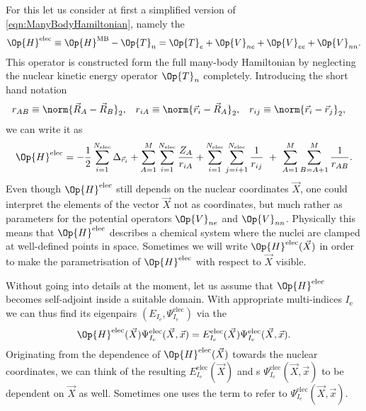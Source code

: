 For this let us consider at first
a simplified version of \eqref{eqn:ManyBodyHamiltonian},
namely the 
\[
	\Op{H}^\text{elec} \equiv \Op{H}^\text{MB} - \Op{T}_n
	= \Op{T}_e + \Op{V}_{ne} + \Op{V}_{ee} + \Op{V}_{nn}.
\]
This operator is constructed form the full many-body Hamiltonian
by neglecting the nuclear kinetic energy operator $\Op{T}_n$ completely.
Introducing the short hand notation
\begin{align*}
r_{AB} &\equiv \norm{\vec{R}_A - \vec{R}_B}_2, &
r_{iA} &\equiv \norm{\vec{r}_i - \vec{R}_A}_2, &
r_{ij} &\equiv \norm{\vec{r}_i - \vec{r}_j}_2, &
\end{align*}
we can write it as
\begin{equation}
	\Op{H}^\text{elec}
	= - \frac12 \sum_{i=1}^{\Nelec} \Delta_{\vec{r}_i}
	+ \sum_{A=1}^M \sum_{i=1}^{\Nelec} \frac{Z_A}{r_{iA}}
	+ \sum_{i=1}^{\Nelec} \sum_{j=i+1}^{\Nelec} \frac{1}{r_{ij}}
	\  + \  %
	\sum_{A=1}^{M} \sum_{B=A+1}^{M} \frac{1}{r_{AB}}.
	\label{eqn:ElectronicFullHamiltonian}
\end{equation}
Even though $\Op{H}^\text{elec}$ still depends on the nuclear coordinates $\vec{X}$,
one could interpret the elements of the vector
$\vec{X}$ not as coordinates,
but much rather as parameters for the potential operators $\Op{V}_{ne}$ and $\Op{V}_{nn}$.
Physically this means that $\Op{H}^\text{elec}$ describes a chemical system
where the nuclei are clamped at well-defined points in space.
Sometimes we will write $\Op{H}^\text{elec}(\vec{X})$
in order to make the parametrisation of $\Op{H}^\text{elec}$ with respect to $\vec{X}$
visible.

\newcommand{\Iel}{I_\text{e}}
\newcommand{\Inu}{I_\text{n}}
Without going into details at the moment,
let us assume that $\Op{H}^\text{elec}$ becomes self-adjoint
inside a suitable domain.
With appropriate multi-indices $\Iel$
we can thus find its eigenpairs $(E_{\Iel}, \Psi^\text{elec}_{\Iel})$
via the 
\begin{equation}
	\Op{H}^\text{elec}(\vec{X}) \Psi^\text{elec}_{\Iel}(\vec{X}, \vec{x})
	= E^\text{elec}_{\Iel}(\vec{X})
		\Psi^\text{elec}_{\Iel}(\vec{X}, \vec{x}).
	\label{eqn:ElectronicSchrödinger}
\end{equation}
Originating from the dependence of $\Op{H}^\text{elec}(\vec{X})$
towards the nuclear coordinates,
we can think of the resulting 
$E^\text{elec}_{\Iel}(\vec{X})$
and s $\Psi^\text{elec}_{\Iel}(\vec{X}, \vec{x})$
to be dependent on $\vec{X}$ as well.
Sometimes one uses the term 
to refer to $\Psi^\text{elec}_{\Iel}(\vec{X}, \vec{x})$.


